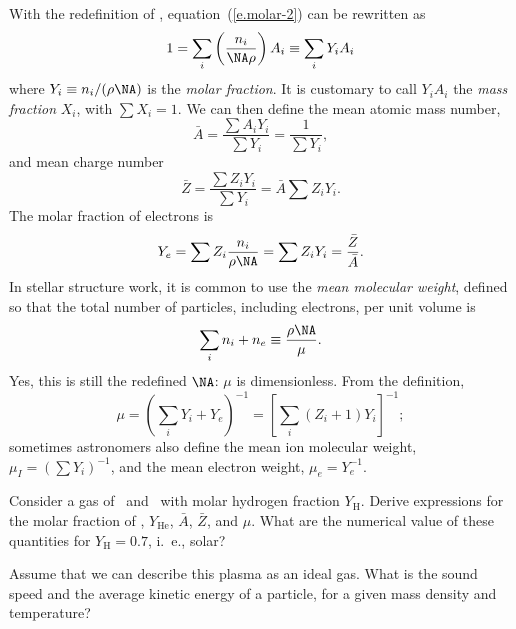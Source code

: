 With the redefinition of \NA, equation~(\ref{e.molar-2}) can be rewritten as
\begin{equation}\label{e.}
1 = \sum_{i}\left(\frac{n_{i}}{\NA\rho}\right)A_{i} \equiv \sum_{i}Y_{i}A_{i}
\end{equation}
where $Y_{i} \equiv n_{i}/(\rho\NA)$ is the \emph{molar fraction}. It is customary to call $Y_{i}A_{i}$ the \emph{mass fraction} $X_{i}$, with $\sum X_{i} = 1$. We can then define the mean atomic mass number,
\begin{equation}\label{e.mean-A}
\bar{A} = \frac{\sum A_{i}Y_{i}}{\sum Y_{i}} = \frac{1}{\sum Y_{i}},
\end{equation}
and mean charge number
\begin{equation}\label{e.mean-Z}
\bar{Z} = \frac{\sum Z_{i}Y_{i}}{\sum Y_{i}} = \bar{A} \sum Z_{i}Y_{i}.
\end{equation}
The molar fraction of electrons is
\begin{equation}\label{e.Ye}
Y_{e} = \sum Z_{i} \frac{n_{i}}{\rho\NA} = \sum Z_{i}Y_{i} = \frac{\bar{Z}}{\bar{A}}.
\end{equation}
In stellar structure work, it is common to use the \emph{mean molecular weight}, defined so that the total number of particles, including electrons, per unit volume is
\begin{equation}\label{e.mean-molecular-weight}
\sum_{i} n_{i} + n_{e} \equiv \frac{\rho\NA}{\mu}.
\end{equation}
Yes, this is still the redefined $\NA$: $\mu$ is dimensionless. From the definition,
\begin{equation}
\mu = \left(\sum_{i}Y_{i} + Y_{e}\right)^{-1} = \left[ \sum_{i}\left(Z_{i}+1\right)Y_{i} \right]^{-1};\label{e.meanmol}
\end{equation}
sometimes astronomers also define the mean ion molecular weight, $\mu_{I} = (\sum Y_{i})^{-1}$, and the mean electron weight, $\mu_{e} = Y_{e}^{-1}$.

\begin{exercisebox}
Consider a gas of \hydrogen\ and \helium\ with molar hydrogen fraction $Y_{\mathrm{H}}$.  Derive expressions for the molar fraction of \helium, $Y_{\mathrm{He}}$, $\bar{A}$, $\bar{Z}$, and $\mu$. What are the numerical value of these quantities for $Y_{\mathrm{H}} = 0.7$, i.~e., solar?
\end{exercisebox}

\begin{exercisebox}
Assume that we can describe this plasma as an ideal gas.  What is the sound speed and the average kinetic energy of a particle, for a given mass density and temperature?
\end{exercisebox}


